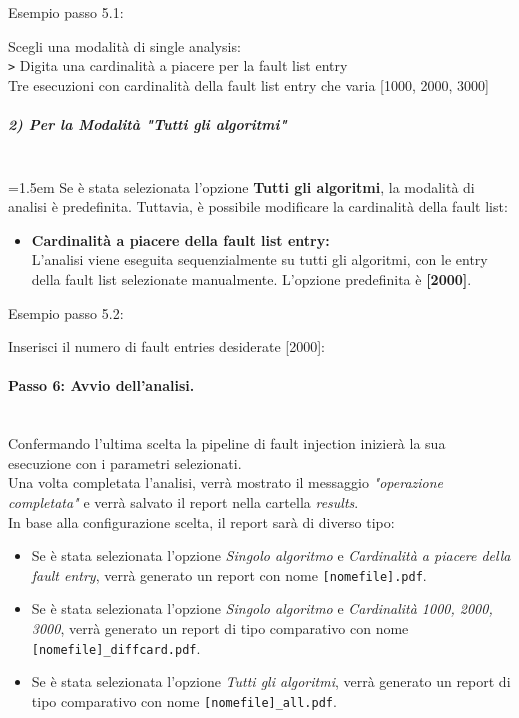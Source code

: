 \documentclass{article}
\begin{document}
Esempio passo 5.1: 
\begin{tcolorbox}[colback=black, coltext=white, sharp corners, boxrule=0.5mm, width=\textwidth]
Scegli una modalità di single analysis: \\
\texttt{>} Digita una cardinalità a piacere per la fault list entry \\
\hspace{2.5em}Tre esecuzioni con cardinalità della fault list entry che varia [1000, 2000, 3000]
\end{tcolorbox}

\subparagraph{2) Per la Modalità "Tutti gli algoritmi"}\leavevmode\\
\hangindent=1.5em   
Se è stata selezionata l'opzione \textbf{Tutti gli algoritmi}, la modalità di analisi è predefinita. Tuttavia, è possibile modificare la cardinalità della fault list:
\begin{itemize}
    \item \textbf{Cardinalità a piacere della fault list entry:}\\
    L'analisi viene eseguita sequenzialmente su tutti gli algoritmi, con le entry della fault list selezionate manualmente. L'opzione predefinita è \textbf{[2000]}.
\end{itemize}

Esempio passo 5.2:
\begin{tcolorbox}[colback=black, coltext=white, sharp corners, boxrule=0.5mm, width=\textwidth]
Inserisci il numero di fault entries desiderate [2000]:
\end{tcolorbox}



\paragraph{Passo 6: Avvio dell'analisi.}\leavevmode\\
Confermando l'ultima scelta la pipeline di fault injection inizierà la sua esecuzione con i parametri selezionati.\\
Una volta completata l'analisi, verrà mostrato il messaggio \textit{"operazione completata"} e verrà salvato il report nella cartella \textit{results}. \\
In base alla configurazione scelta, il report sarà di diverso tipo:
\begin{itemize}
    \item Se è stata selezionata l'opzione \textit{Singolo algoritmo} e \textit{Cardinalità a piacere della fault entry}, verrà generato un report con nome \texttt{[nomefile].pdf}.
    \item Se è stata selezionata l'opzione \textit{Singolo algoritmo} e \textit{Cardinalità 1000, 2000, 3000}, verrà generato un report di tipo comparativo con nome \texttt{[nomefile]\_diffcard.pdf}.
    \item Se è stata selezionata l'opzione \textit{Tutti gli algoritmi}, verrà generato un report di tipo comparativo con nome \texttt{[nomefile]\_all.pdf}.
\end{itemize}
\end{document}
